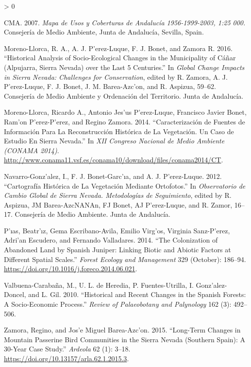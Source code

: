 \documentclass[
]{article}
\newlength{\cslhangindent}
\newenvironment{CSLReferences}[2] %
 {%
  \setlength{\parindent}{0pt}
  \ifodd #1 \everypar{\setlength{\hangindent}{\cslhangindent}}\ignorespaces\fi
  \ifnum #2 > 0
  \setlength{\parskip}{#2\baselineskip}
  \fi
 }%
 {}
\begin{document}
\begin{CSLReferences}{1}{0}
\leavevmode\hypertarget{ref-CMA2007MapaUsos}{}%
CMA. 2007. \emph{Mapa de Usos y Coberturas de {Andalucía}
1956-1999-2003, 1:25 000.} {Consejería de Medio Ambiente, Junta de
Andalucía, Sevilla, Spain}.

\leavevmode\hypertarget{ref-MorenoLlorcaetal2016HistoricalAnalysis}{}%
Moreno-Llorca, R. A., A. J. P'erez-Luque, F. J. Bonet, and Zamora R.
2016. {``Historical Analysis of Socio-Ecological Changes in the
Municipality of {Cáñar} ({Alpujarra}, {Sierra Nevada}) over the Last 5
Centuries.''} In \emph{Global Change Impacts in {Sierra Nevada}:
Challenges for Conservation}, edited by R. Zamora, A. J. P'erez-Luque,
F. J. Bonet, J. M. Barea-Azc'on, and R. Aspizua, 59--62. {Consejería de
Medio Ambiente y Ordenación del Territorio. Junta de Andalucía}.

\leavevmode\hypertarget{ref-MorenoLlorcaetal2014CaracterizacionFuentes}{}%
Moreno-Llorca, Ricardo A., Antonio Jes'us P'erez-Luque, Francisco Javier
Bonet, Ram'on P'erez-P'erez, and Regino Zamora. 2014. {``Caracterización
de Fuentes de Información Para La Reconstrucción Histórica de La
Vegetación. {Un} Caso de Estudio En {Sierra Nevada}.''} In \emph{{XII
Congreso Nacional} de {Medio Ambiente} ({CONAMA} 2014)}.
\url{http://www.conama11.vsf.es/conama10/download/files/conama2014/CT}.

\leavevmode\hypertarget{ref-NavarroGonzalezetal2012CartografiaHistorica}{}%
Navarro-Gonz'alez, I., F. J. Bonet-Garc'ıa, and A. J. P'erez-Luque.
2012. {``Cartografía Histórica de La Vegetación Mediante Ortofotos.''}
In \emph{Observatorio de {Cambio Global} de {Sierra Nevada}.
{Metodologías} de Seguimiento}, edited by R. Aspizua, JM Barea-AzcNANAn,
FJ Bonet, AJ P'erez-Luque, and R. Zamor, 16--17. {Consejería de Medio
Ambiente. Junta de Andalucía}.

\leavevmode\hypertarget{ref-Piasetal2014ColonizationAbandoned}{}%
P'ıas, Beatr'ız, Gema Escribano-Avila, Emilio Virg'os, Virginia
Sanz-P'erez, Adri'an Escudero, and Fernando Valladares. 2014. {``The
Colonization of Abandoned Land by {Spanish} Juniper: {Linking} Biotic
and Abiotic Factors at Different Spatial Scales.''} \emph{Forest Ecology
and Management} 329 (October): 186--94.
\url{https://doi.org/10.1016/j.foreco.2014.06.021}.

\leavevmode\hypertarget{ref-ValbuenaCarabanaetal2010HistoricalRecent}{}%
Valbuena-Carabaña, M., U. L. de Heredia, P. Fuentes-Utrilla, I.
Gonz'alez-Doncel, and L. Gil. 2010. {``Historical and Recent Changes in
the {Spanish} Forests: A Socio-Economic Process.''} \emph{Review of
Palaeobotany and Palynology} 162 (3): 492--506.

\leavevmode\hypertarget{ref-ZamoraBareaAzcon2015LongTermChanges}{}%
Zamora, Regino, and Jos'e Miguel Barea-Azc'on. 2015. {``Long-{Term
Changes} in {Mountain Passerine Bird Communities} in the {Sierra Nevada}
({Southern Spain}): {A} 30-{Year Case Study}.''} \emph{Ardeola} 62 (1):
3--18. \url{https://doi.org/10.13157/arla.62.1.2015.3}.

\end{CSLReferences}
\end{document}
